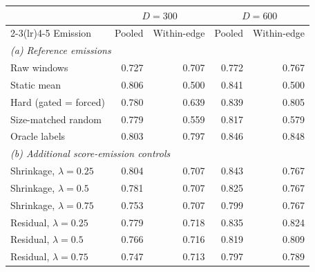 \begin{tabular}{lrrrr}
\toprule
 & \multicolumn{2}{c}{$D=300$} & \multicolumn{2}{c}{$D=600$} \\
\cmidrule(lr){2-3}\cmidrule(lr){4-5}
Emission & Pooled & Within-edge & Pooled & Within-edge \\
\midrule
\multicolumn{5}{l}{\textit{(a) Reference emissions}} \\
Raw windows & 0.727 & 0.707 & 0.772 & 0.767 \\
Static mean & 0.806 & 0.500 & 0.841 & 0.500 \\
Hard (gated = forced) & 0.780 & 0.639 & 0.839 & 0.805 \\
Size-matched random & 0.779 & 0.559 & 0.817 & 0.579 \\
Oracle labels & 0.803 & 0.797 & 0.846 & 0.848 \\
\midrule
\multicolumn{5}{l}{\textit{(b) Additional score-emission controls}} \\
Shrinkage, $\lambda=0.25$ & 0.804 & 0.707 & 0.843 & 0.767 \\
Shrinkage, $\lambda=0.5$ & 0.781 & 0.707 & 0.825 & 0.767 \\
Shrinkage, $\lambda=0.75$ & 0.753 & 0.707 & 0.799 & 0.767 \\
Residual, $\lambda=0.25$ & 0.779 & 0.718 & 0.835 & 0.824 \\
Residual, $\lambda=0.5$ & 0.766 & 0.716 & 0.819 & 0.809 \\
Residual, $\lambda=0.75$ & 0.747 & 0.713 & 0.797 & 0.789 \\
\bottomrule
\end{tabular}
